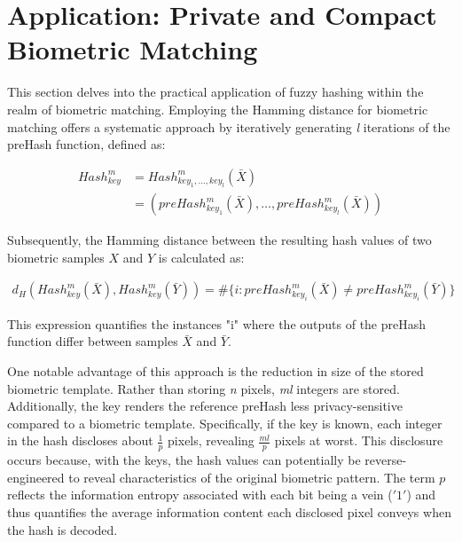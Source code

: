 \newpage
\section{Application: Private and Compact Biometric Matching}
\label{sec:Application: Private and Compact Biometric Matching}

This section delves into the practical application of fuzzy hashing within the realm of biometric matching. Employing the Hamming distance for biometric matching offers a systematic approach by iteratively generating \textit{l} iterations of the preHash function, defined as:

\begin{equation}
    \begin{aligned}
        Hash_{key}^m &= Hash_{key_1, \ldots, key_l}^m(\bar{X})\\
        &= (preHash_{key_1}^m(\bar{X}), \ldots, preHash_{key_l}^m(\bar{X}))
    \end{aligned}
\end{equation}

Subsequently, the Hamming distance between the resulting hash values of two biometric samples \(X\) and \(Y\) is calculated as:

\begin{equation}
    \begin{aligned}
        \label{eq:HammingDist}
        d_H(Hash_{key}^m(\bar{X}), Hash_{key}^m(\bar{Y})) = \# \{i: preHash_{key_i}^m(\bar{X}) \neq preHash_{key_i}^m(\bar{Y})\}
    \end{aligned}
\end{equation}

This expression quantifies the instances "i" where the outputs of the preHash function differ between samples \(\bar{X}\) and \(\bar{Y}\).

One notable advantage of this approach is the reduction in size of the stored biometric template. Rather than storing \textit{n} pixels, \textit{ml} integers are stored. Additionally, the key renders the reference preHash less privacy-sensitive compared to a biometric template. Specifically, if the key is known, each integer in the hash discloses about \(\frac{1}{p}\) pixels, revealing \(\frac{ml}{p}\) pixels at worst. This disclosure occurs because, with the keys, the hash values can potentially be reverse-engineered to reveal characteristics of the original biometric pattern. The term \(p\)​ reflects the information entropy associated with each bit being a vein (\('1'\)) and thus quantifies the average information content each disclosed pixel conveys when the hash is decoded.

